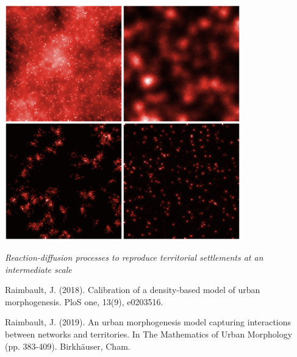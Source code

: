\documentclass[english,11pt]{beamer}
\begin{document}
{\begin{columns}
\begin{column}{0.5\textwidth}
	\nocite{raimbault2014hybrid}

	\end{column}
	\vrule{}
	\begin{column}{0.5\textwidth}
	
	\vspace{-0.5cm}
	\begin{center}
	\includegraphics[width=0.8\textwidth]{figuresslides/density_Fig2}
	\end{center}
	
	\medskip
	\footnotesize
	
	\textit{Reaction-diffusion processes to reproduce territorial settlements at an intermediate scale}
	
	\medskip
	
	\tiny
	
Raimbault, J. (2018). Calibration of a density-based model of urban morphogenesis. PloS one, 13(9), e0203516.

\nocite{raimbault2018calibration}

\smallskip

Raimbault, J. (2019). An urban morphogenesis model capturing interactions between networks and territories. In The Mathematics of Urban Morphology (pp. 383-409). Birkhäuser, Cham.

\nocite{raimbault2019urban}
	

	\end{column}

\end{columns}

}
\end{document}
